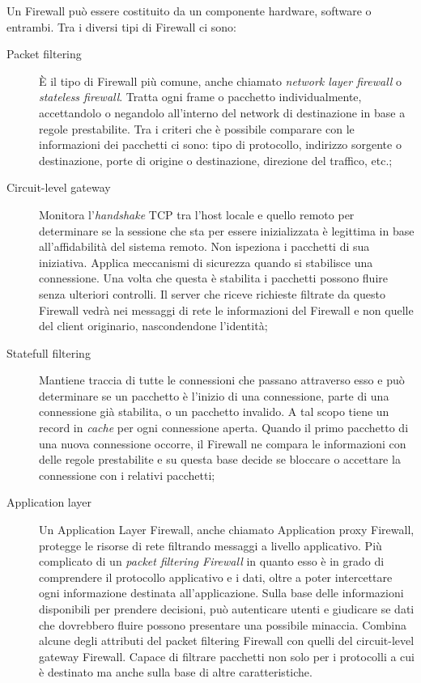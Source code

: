 Un Firewall può essere costituito da un componente hardware, software o entrambi.
Tra i diversi tipi di Firewall ci sono:
\begin{description}
    \item[Packet filtering] È il tipo di Firewall più comune, anche chiamato \textit{network layer firewall} o \textit{stateless firewall}. Tratta ogni frame o pacchetto individualmente, accettandolo o negandolo all'interno del network di destinazione in base a regole prestabilite. Tra i criteri che è possibile comparare con le informazioni dei pacchetti ci sono: tipo di protocollo, indirizzo sorgente o destinazione, porte di origine o destinazione, direzione del traffico, etc.;
    \item[Circuit-level gateway] Monitora  l'\textit{handshake} TCP tra l'host locale e quello remoto per determinare se la sessione che sta per essere inizializzata è legittima in base all'affidabilità del sistema remoto. Non ispeziona i pacchetti di sua iniziativa. Applica meccanismi di sicurezza quando si stabilisce una connessione. Una volta che questa è stabilita i pacchetti possono fluire senza ulteriori controlli. Il server che riceve richieste filtrate da questo Firewall vedrà nei messaggi di rete le informazioni del Firewall e non quelle del client originario, nascondendone l'identità;
    \item[Statefull filtering] Mantiene traccia di tutte le connessioni che passano attraverso esso e può determinare se un pacchetto è l'inizio di una connessione, parte di una connessione già stabilita, o un pacchetto invalido. A tal scopo tiene un record in \textit{cache} per ogni connessione aperta. Quando il primo pacchetto di una nuova connessione occorre, il Firewall ne compara le informazioni con delle regole prestabilite e su questa base decide se bloccare o accettare la connessione con i relativi pacchetti;
    \item[Application layer] Un Application Layer Firewall, anche chiamato Application proxy Firewall, protegge le risorse di rete filtrando messaggi a livello applicativo. Più complicato di un \textit{packet filtering Firewall} in quanto esso è in grado di comprendere il protocollo applicativo e i dati, oltre a poter intercettare ogni informazione destinata all'applicazione. Sulla base delle informazioni disponibili per prendere decisioni, può autenticare utenti e giudicare se dati che dovrebbero fluire possono presentare una possibile minaccia. Combina alcune degli attributi del packet filtering Firewall con quelli del circuit-level  gateway Firewall. Capace di filtrare pacchetti non solo per i protocolli  a cui è destinato ma anche sulla base di altre caratteristiche.


\end{description}
